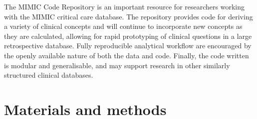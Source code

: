 \documentclass{elsart}
\begin{document}




The MIMIC Code Repository is an important resource for researchers working with the MIMIC critical care database. The repository provides code for deriving a variety of clinical concepts and will continue to incorporate new concepts as they are calculated, allowing for rapid prototyping of clinical questions in a large retrospective database. 
Fully reproducible analytical workflow are encouraged by the openly available nature of both the data and code.
Finally, the code written is modular and generalisable, and may support research in other similarly structured clinical databases.



\section{Materials and methods}

\end{document}
